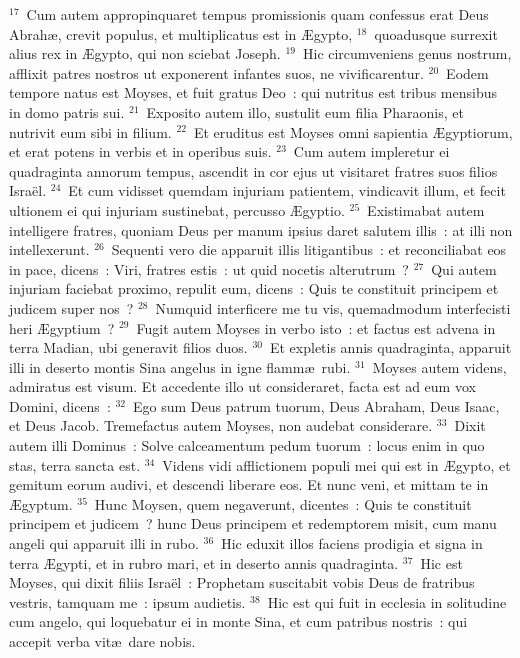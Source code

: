 ${}^{17}$~Cum autem appropinquaret tempus promissionis quam confessus erat Deus Abrah\ae , crevit populus, et multiplicatus est in \AE gypto,
${}^{18}$~quoadusque surrexit alius rex in \AE gypto, qui non sciebat Joseph.
${}^{19}$~Hic circumveniens genus nostrum, afflixit patres nostros ut exponerent infantes suos, ne vivificarentur.
${}^{20}$~Eodem tempore natus est Moyses, et fuit gratus Deo~: qui nutritus est tribus mensibus in domo patris sui.
${}^{21}$~Exposito autem illo, sustulit eum filia Pharaonis, et nutrivit eum sibi in filium.
${}^{22}$~Et eruditus est Moyses omni sapientia \AE gyptiorum, et erat potens in verbis et in operibus suis.
${}^{23}$~Cum autem impleretur ei quadraginta annorum tempus, ascendit in cor ejus ut visitaret fratres suos filios Isra\"el.
${}^{24}$~Et cum vidisset quemdam injuriam patientem, vindicavit illum, et fecit ultionem ei qui injuriam sustinebat, percusso \AE gyptio.
${}^{25}$~Existimabat autem intelligere fratres, quoniam Deus per manum ipsius daret salutem illis~: at illi non intellexerunt.
${}^{26}$~Sequenti vero die apparuit illis litigantibus~: et reconciliabat eos in pace, dicens~: Viri, fratres estis~: ut quid nocetis alterutrum~?
${}^{27}$~Qui autem injuriam faciebat proximo, repulit eum, dicens~: Quis te constituit principem et judicem super nos~?
${}^{28}$~Numquid interficere me tu vis, quemadmodum interfecisti heri \AE gyptium~?
${}^{29}$~Fugit autem Moyses in verbo isto~: et factus est advena in terra Madian, ubi generavit filios duos.
${}^{30}$~Et expletis annis quadraginta, apparuit illi in deserto montis Sina angelus in igne flamm\ae\ rubi.
${}^{31}$~Moyses autem videns, admiratus est visum. Et accedente illo ut consideraret, facta est ad eum vox Domini, dicens~:
${}^{32}$~Ego sum Deus patrum tuorum, Deus Abraham, Deus Isaac, et Deus Jacob. Tremefactus autem Moyses, non audebat considerare.
${}^{33}$~Dixit autem illi Dominus~: Solve calceamentum pedum tuorum~: locus enim in quo stas, terra sancta est.
${}^{34}$~Videns vidi afflictionem populi mei qui est in \AE gypto, et gemitum eorum audivi, et descendi liberare eos. Et nunc veni, et mittam te in \AE gyptum.
${}^{35}$~Hunc Moysen, quem negaverunt, dicentes~: Quis te constituit principem et judicem~? hunc Deus principem et redemptorem misit, cum manu angeli qui apparuit illi in rubo.
${}^{36}$~Hic eduxit illos faciens prodigia et signa in terra \AE gypti, et in rubro mari, et in deserto annis quadraginta.
${}^{37}$~Hic est Moyses, qui dixit filiis Isra\"el~: Prophetam suscitabit vobis Deus de fratribus vestris, tamquam me~: ipsum audietis.
${}^{38}$~Hic est qui fuit in ecclesia in solitudine cum angelo, qui loquebatur ei in monte Sina, et cum patribus nostris~: qui accepit verba vit\ae\ dare nobis.
